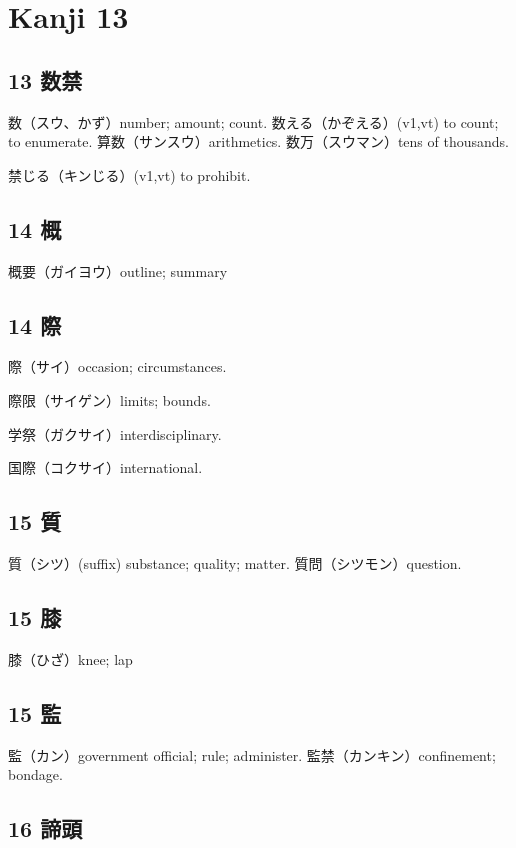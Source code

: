 \chapter{Kanji 13}

\section{13 数禁}

数（スウ、かず）number; amount; count.
数える（かぞえる）(v1,vt) to count; to enumerate.
算数（サンスウ）arithmetics.
数万（スウマン）tens of thousands.

禁じる（キンじる）(v1,vt) to prohibit.

\section{14 概}

概要（ガイヨウ）outline; summary

\section{14 際}

際（サイ）occasion; circumstances.

際限（サイゲン）limits; bounds.

学祭（ガクサイ）interdisciplinary.

国際（コクサイ）international.

\section{15 質}

質（シツ）(suffix) substance; quality; matter.
質問（シツモン）question.

\section{15 膝}

膝（ひざ）knee; lap

\section{15 監}

監（カン）government official; rule; administer.
監禁（カンキン）confinement; bondage.

\section{16 諦頭}

